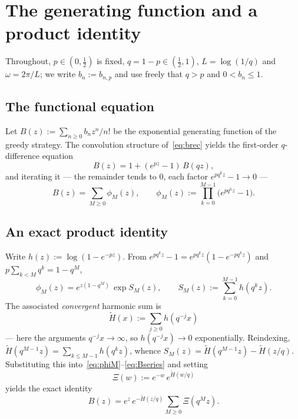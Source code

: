 \documentclass[11pt]{article}
\theoremstyle{definition}
\begin{document}
\section{The generating function and a product
  identity}\label{sec:gf}

Throughout, $p\in(0,\tfrac12)$ is fixed, $q=1-p\in(\tfrac12,1)$,
$L=\log(1/q)$ and $\omega=2\pi/L$; we write $b_n:=b_{n,p}$ and use
freely that $q>p$ and $0<b_n\le1$.

\subsection{The functional equation}

Let $B(z):=\sum_{n\ge0}b_nz^n/n!$ be the exponential generating
function of the greedy strategy. The convolution structure
of~\eqref{eq:brec} yields the first-order $q$-difference equation
\begin{equation}\label{eq:Bfunc}
  B(z)=1+(e^{pz}-1)\,B(qz),
\end{equation}
and iterating it --- the remainder tends to $0$, each factor
$e^{pq^kz}-1\to0$ ---
\begin{equation}\label{eq:Bseries}
  B(z)=\sum_{M\ge0}\phi_M(z),\qquad
  \phi_M(z):=\prod_{k=0}^{M-1}\bigl(e^{pq^kz}-1\bigr).
\end{equation}

\subsection{An exact product identity}\label{sec:identity}

Write $h(z):=\log(1-e^{-pz})$. From $e^{pq^kz}-1=e^{pq^kz}
(1-e^{-pq^kz})$ and $p\sum_{k<M}q^k=1-q^M$,
\begin{equation}\label{eq:phiM}
  \phi_M(z)=e^{z(1-q^M)}\,\exp S_M(z),\qquad
  S_M(z):=\sum_{k=0}^{M-1}h(q^kz).
\end{equation}
The associated \emph{convergent} harmonic sum is
\begin{equation}\label{eq:Htilde}
  \tilde H(x):=\sum_{j\ge0}h(q^{-j}x)
\end{equation}
--- here the arguments $q^{-j}x\to\infty$, so $h(q^{-j}x)\to0$
exponentially. Reindexing, $\tilde H(q^{M-1}z)=\sum_{k\le M-1}
h(q^kz)$, whence $S_M(z)=\tilde H(q^{M-1}z)-\tilde H(z/q)$.
Substituting this into~\eqref{eq:phiM}--\eqref{eq:Bseries} and setting
\begin{equation}\label{eq:Xi}
  \Xi(w):=e^{-w}\,e^{\tilde H(w/q)}
\end{equation}
yields the exact identity
\begin{equation}\label{eq:Bidentity}
  B(z)=e^{z}\,e^{-\tilde H(z/q)}\sum_{M\ge0}\Xi(q^Mz).
\end{equation}
\end{document}

